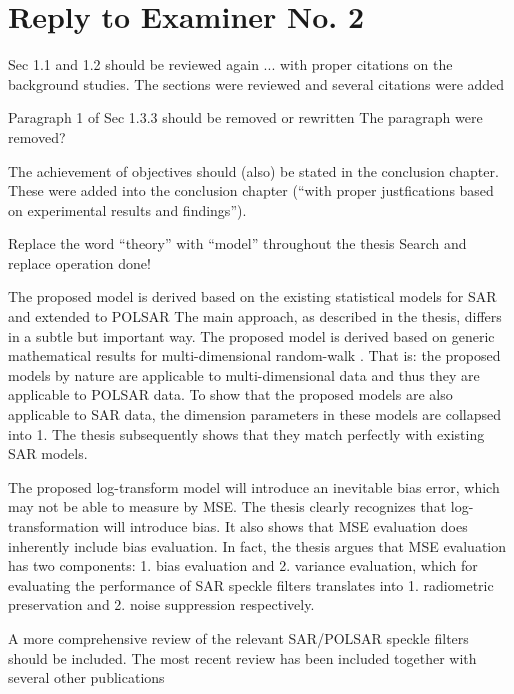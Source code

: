 \section*{Reply to Examiner No. 2}

\begin{replyheader}
\end{replyheader}  

\replyToComment
    {Sec 1.1 and 1.2 should be reviewed again ... with proper citations on the background studies.}
    {The sections were reviewed and several citations were added}

\replyToComment
    {Paragraph 1 of Sec 1.3.3 should be removed or rewritten}
    {The paragraph were removed?}
    
\replyToComment
    {The achievement of objectives should (also) be stated in the conclusion chapter. }
    {These were added into the conclusion chapter (``with proper justfications based on experimental results and findings'').}

\replyToComment
    {Replace the word ``theory'' with ``model'' throughout the thesis}
    {Search and replace operation done!}
    
\replyToComment
    {The proposed model is derived based on the existing statistical models for SAR and extended to POLSAR}
    {The main approach, as described in the thesis, differs in a subtle but important way.
The proposed model is derived based on generic mathematical results for multi-dimensional random-walk \cite{Goodman_JOptSocAm_76, Goodman_Springer_1975}.
That is: the proposed models by nature are applicable to multi-dimensional data and thus they are applicable to POLSAR data.
To show that the proposed models are also applicable to SAR data, the dimension parameters in these models are collapsed into 1.
The thesis subsequently shows that they match perfectly with existing SAR models.
}

\replyToComment
    {The proposed log-transform model will introduce an inevitable bias error, which may not be able to measure by MSE.}
    {
      The thesis clearly recognizes that log-transformation will introduce bias.
      It also shows that MSE evaluation does inherently include bias evaluation.
      In fact, the thesis argues that MSE evaluation has two components: 1. bias evaluation and 2. variance evaluation, which for evaluating the performance of SAR speckle filters translates into 1. radiometric preservation and 2. noise suppression respectively.
}

\replyToComment
    {A more comprehensive review of the relevant SAR/POLSAR speckle filters should be included.}
    {The most recent review \cite{Argenti_GRSM_2013} has been included together with several other publications \cite{Lee_RSReviews_1994, Cetin_ProcSPIE_2000, White_ProcSPIE_1994, Sattar_TIP_1997, Wang_TIP_2004, Nielsen_2012_ICASSP}}

